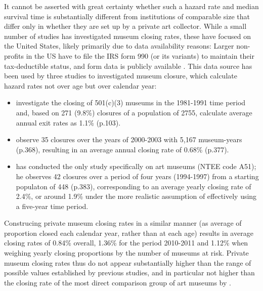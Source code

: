 \documentclass[12pt]{article}
\begin{document}
It cannot be asserted with great certainty whether such a hazard rate and median survival time is substantially different from institutions of comparable size that differ only in whether they are set up by a private art collector.
While a small number of studies has investigated museum closing rates, these have focused on the United States, likely primarily due to data availability reasons: 
Larger non-profits in the US have to file the IRS form 990 (or its variants) to maintain their tax-deductible status, and form data is publicly available \parencite{Lecy_2023_core,Lecy_2023_core}.
This data source has been used by three studies to investigated museum closure, which calculate hazard rates not over age but over calendar year:
\begin{itemize}
\item \textcite{Bowen_etal_1994_charitable} investigate the closing of 501(c)(3) museums in the 1981-1991 time period and, based on 271 (9.8\%) closures of a population of 2755, calculate average annual exit rates as 1.1\% (p.103).
\item \textcite{Gordon_etal_2013_insolvency} observe 35 closures over the years of 2000-2003 with 5,167 museum-years (p.368), resulting in an average annual closing rate of 0.68\% (p.377).
\item \textcite{Hager_2001_vulnerability} has conducted the only study specifically on art museums (NTEE code A51); he observes 42 closures over a period of four years (1994-1997) from a starting populaton of 448 (p.383), corresponding to an average yearly closing rate of 2.4\%, or around 1.9\% under the more realistic assumption of effectively using a five-year time period.
\end{itemize}

Construcing private museum closing rates in a similar manner (as average of proportion closed each calendar year, rather than at each age) results in average closing rates of 0.84\% overall, 1.36\% for the period 2010-2011 and 1.12\% when weighing yearly closing proportions by the number of museums at risk.
Private museum closing rates thus do not appear substantially higher than the range of possible values established by previous studies, and in particular not higher than the closing rate of the most direct comparison group of art museums by \textcite{Hager_2001_vulnerability}. 
\end{document}
